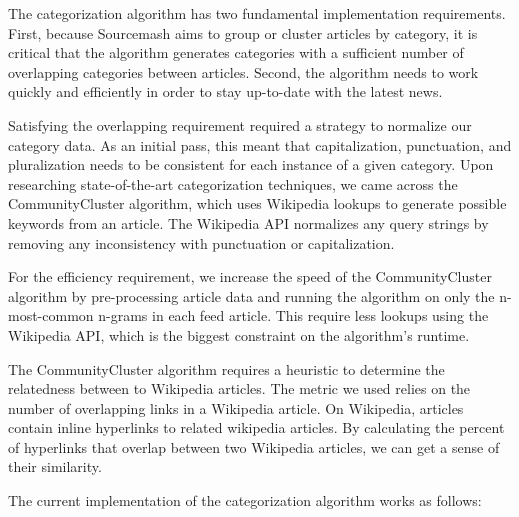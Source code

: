 \documentclass[11pt]{article}
\begin{document}
The categorization algorithm has two fundamental implementation requirements. First, because Sourcemash aims to group or cluster articles by category, it is critical that the algorithm generates categories with a sufficient number of overlapping categories between articles. Second, the algorithm needs to work quickly and efficiently in order to stay up-to-date with the latest news.

Satisfying the overlapping requirement required a strategy to normalize our category data. As an initial pass, this meant that capitalization, punctuation, and pluralization needs to be consistent for each instance of a given category. Upon researching state-of-the-art categorization techniques, we came across the CommunityCluster algorithm\cite{Grineva}, which uses Wikipedia lookups to generate possible keywords from an article. The Wikipedia API normalizes any query strings by removing any inconsistency with punctuation or capitalization.

For the efficiency requirement, we increase the speed of the CommunityCluster algorithm by pre-processing article data and running the algorithm on only the n-most-common n-grams in each feed article. This require less lookups using the Wikipedia API, which is the biggest constraint on the algorithm's runtime.

The CommunityCluster algorithm requires a heuristic to determine the relatedness between to Wikipedia articles. The metric we used relies on the number of overlapping links in a Wikipedia article. On Wikipedia, articles contain inline hyperlinks to related wikipedia articles. By calculating the percent of hyperlinks that overlap between two Wikipedia articles, we can get a sense of their similarity.

The current implementation of the categorization algorithm works as follows:
\end{document}
